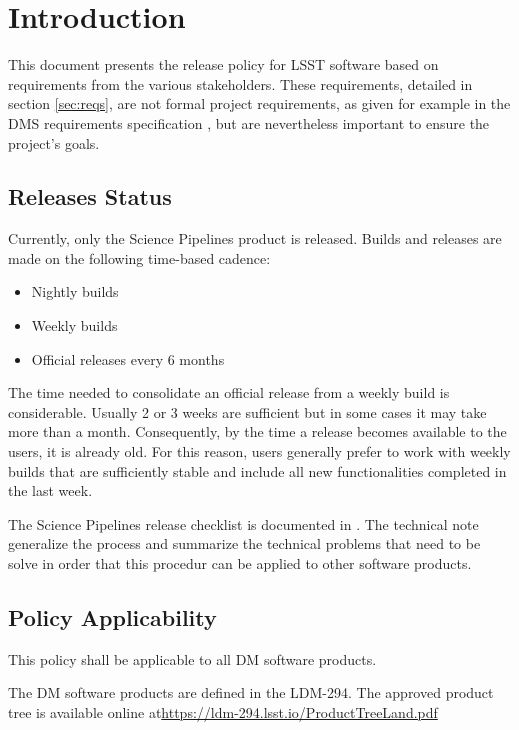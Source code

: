 \section{Introduction} \label{sec:intro}

This document presents the release policy for \gls{LSST} software based on requirements from the various stakeholders.
These requirements, detailed in section \ref{sec:reqs}, are not formal project requirements, as given for example in the \gls{DMS} requirements specification , but are nevertheless important to ensure the project's goals.


\subsection{Releases Status}\label{sec:sci}

Currently, only the \gls{Science Pipelines} product is released. 
Builds and releases are made on the following time-based cadence:

\begin{itemize}
\item Nightly builds
\item Weekly builds
\item Official releases every 6 months
\end{itemize}

The time needed to consolidate an official release from a weekly build is considerable.
Usually 2 or 3 weeks are sufficient but in some cases it may take more than a month. 
Consequently, by the time a release becomes available to the users, it is already old.
For this reason, users generally prefer to work with weekly builds that are sufficiently stable and include all new functionalities completed in the last week.

The \gls{Science Pipelines} release checklist is documented in .
The technical note  generalize the process and summarize the technical problems that need to be solve in order that this procedur can be applied to other software products.


\subsection{Policy Applicability} \label{sec:applicability}

This policy shall be applicable to all \gls{DM} software products.

The \gls{DM} software products are defined in the LDM-294. 
The approved product tree is available online at\url{https://ldm-294.lsst.io/ProductTreeLand.pdf}

